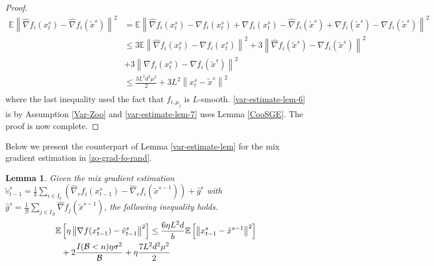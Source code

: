 \documentclass[iicol,sn-basic]{sn-jnl}
\theoremstyle{thmstyleone}%
\theoremstyle{thmstyletwo}%
\theoremstyle{thmstylethree}%
\newcommand*{\E}{\mathbb{E}}
\newcommand{\norm}[1]{\left\lVert#1\right\rVert}
\newtheorem{lemma}[theorem]{Lemma}
\begin{document}
\begin{proof}
  \begin{equation}
 \begin{split}
 \E \norm{\hat{\nabla} f_i(x_{t}^s)-\hat{\nabla} f_i(\tilde{x}^s)}^2 &= \E \norm{ \hat{\nabla} f_i(x_{t}^s)-{\nabla} f_i(x_{t}^s) + {\nabla} f_i(x_{t}^s)-\hat{\nabla} f_i(\tilde{x}^s)+{\nabla} f_i(\tilde{x}^s)-{\nabla} f_i(\tilde{x}^s)}^2\\
 &\leq 3 \E \norm{ \hat{\nabla} f_i(x_{t}^s)-{\nabla} f_i(x_{t}^s)}^2 + 3\norm{\hat{\nabla} f_i(\tilde{x}^s) - {\nabla} f_i(\tilde{x}^s)}^2\\
 &+ 3\norm{{\nabla} f_i(x_{t}^s) - {\nabla} f_i(\tilde{x}^s)}^2\\
 &\leq \frac{3 L^2 d^2 \mu^2}{2} + 3L^2 \norm{x_{t}^s-\tilde{x}^s}^2\\
 \end{split}
 \end{equation}
  where the last inequality used the fact that $f_{i,\mu_j}$ is $L$-smooth. \eqref{var-estimate-lem-6} is by Assumption \ref{Var-Zoo} and \eqref{var-estimate-lem-7} uses Lemma \ref{CooSGE}. The proof is now complete.
\end{proof}
Below we present the counterpart of Lemma \ref{var-estimate-lem} for the mix gradient estimation in \eqref{zo-grad-fo-rand}.
\begin{lemma}\label{RandSGE-var-estimate-lem}
Given the mix gradient estimation $\tilde{v}_{t-1}^s = \frac{1}{b} \sum_{i\in I_b}\left(\hat{\nabla}_r f_{i}(x_{t-1}^s)-\hat{\nabla}_r f_{i}(\tilde{x}^{s-1})\right)+\hat{g}^s$ with $\hat{g}^s = \frac{1}{\mathcal{B}} \sum_{j\in I_{\mathcal{B}}} \hat{\nabla} f_j (\tilde{x}^{s-1})$, the following inequality holds. 
\begin{align}
\E&\left[\eta\norm{\nabla f(x_{t-1}^s)-{\tilde{v}_{t-1}^s}}^2\right] \leq  \frac{6\eta L^2 d}{b}\E\left[\norm{x_{t-1}^s-\tilde{x}^{s-1}}^2\right]\notag\\
&+ 2\frac{I(\mathcal{B} < n)\eta \sigma ^2}{\mathcal{B}}+\eta \frac{7L^2 d^2 \mu^2}{2}
\end{align}
\end{lemma}
\end{document}
